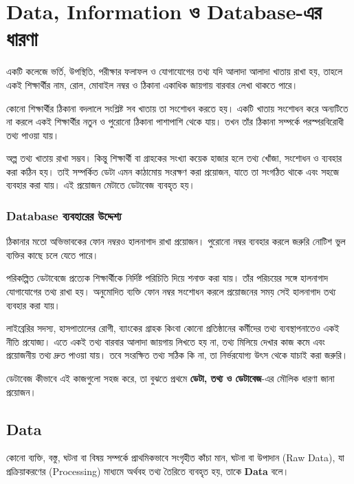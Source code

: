 \section{Data, Information ও Database-এর ধারণা}

একটি কলেজে ভর্তি, উপস্থিতি, পরীক্ষার ফলাফল ও যোগাযোগের তথ্য যদি আলাদা আলাদা খাতায় রাখা হয়, তাহলে একই শিক্ষার্থীর নাম, রোল, মোবাইল নম্বর ও ঠিকানা একাধিক জায়গায় বারবার লেখা থাকতে পারে।

কোনো শিক্ষার্থীর ঠিকানা বদলালে সংশ্লিষ্ট সব খাতায় তা সংশোধন করতে হয়। একটি খাতায় সংশোধন করে অন্যটিতে না করলে একই শিক্ষার্থীর নতুন ও পুরোনো ঠিকানা পাশাপাশি থেকে যায়। তখন তাঁর ঠিকানা সম্পর্কে পরস্পরবিরোধী তথ্য পাওয়া যায়।

অল্প তথ্য খাতায় রাখা সম্ভব। কিন্তু শিক্ষার্থী বা গ্রাহকের সংখ্যা কয়েক হাজার হলে তথ্য খোঁজা, সংশোধন ও ব্যবহার করা কঠিন হয়। তাই সম্পর্কিত ডেটা এমন কাঠামোয় সংরক্ষণ করা প্রয়োজন, যাতে তা সংগঠিত থাকে এবং সহজে ব্যবহার করা যায়। এই প্রয়োজন মেটাতে ডেটাবেজ ব্যবহৃত হয়।


\subsubsection{Database ব্যবহারের উদ্দেশ্য}

ঠিকানার মতো অভিভাবকের ফোন নম্বরও হালনাগাদ রাখা প্রয়োজন। পুরোনো নম্বর ব্যবহার করলে জরুরি নোটিশ ভুল ব্যক্তির কাছে চলে যেতে পারে।

পরিকল্পিত ডেটাবেজে প্রত্যেক শিক্ষার্থীকে নির্দিষ্ট পরিচিতি দিয়ে শনাক্ত করা যায়। তাঁর পরিচয়ের সঙ্গে হালনাগাদ যোগাযোগের তথ্য রাখা হয়। অনুমোদিত ব্যক্তি ফোন নম্বর সংশোধন করলে প্রয়োজনের সময় সেই হালনাগাদ তথ্য ব্যবহার করা যায়।

লাইব্রেরির সদস্য, হাসপাতালের রোগী, ব্যাংকের গ্রাহক কিংবা কোনো প্রতিষ্ঠানের কর্মীদের তথ্য ব্যবস্থাপনাতেও একই নীতি প্রযোজ্য। এতে একই তথ্য বারবার আলাদা জায়গায় লিখতে হয় না, তথ্য মিলিয়ে দেখার কাজ কমে এবং প্রয়োজনীয় তথ্য দ্রুত পাওয়া যায়। তবে সংরক্ষিত তথ্য সঠিক কি না, তা নির্ভরযোগ্য উৎস থেকে যাচাই করা জরুরি।

ডেটাবেজ কীভাবে এই কাজগুলো সহজ করে, তা বুঝতে প্রথমে \textbf{ডেটা, তথ্য ও ডেটাবেজ}-এর মৌলিক ধারণা জানা প্রয়োজন।

\subsection{Data}

\begin{definitionbox}{}
কোনো ব্যক্তি, বস্তু, ঘটনা বা বিষয় সম্পর্কে প্রাথমিকভাবে সংগৃহীত
কাঁচা মান, ঘটনা বা উপাদান (Raw Data), যা প্রক্রিয়াকরণের (Processing) মাধ্যমে অর্থবহ তথ্য
তৈরিতে ব্যবহৃত হয়, তাকে \textbf{Data} বলে।
\end{definitionbox}


